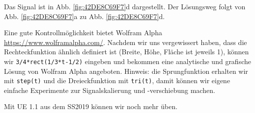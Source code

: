 \documentclass[11pt,a4paper,DIV=12]{scrartcl}
\numberwithin{equation}{section}
\numberwithin{figure}{section}
\newcommand{\fig}[1]{Abb. \ref{#1}} %
\begin{document}
\begin{Loesung}
Das Signal ist in \fig{fig:42DE8C69F7}d dargestellt. Der Lösungsweg folgt von
\fig{fig:42DE8C69F7}a zu \fig{fig:42DE8C69F7}d.

Eine gute Kontrollmöglichkeit bietet Wolfram Alpha
\url{https://www.wolframalpha.com/}.
Nachdem wir uns vergewissert haben, dass die Rechteckfunktion ähnlich definiert
ist (Breite, Höhe, Fläche ist jeweils 1), können wir
\verb|3/4*rect(1/3*t-1/2)| eingeben und bekommen eine analytische und grafische
Lösung von Wolfram Alpha angeboten.
Hinweis: die Sprungfunktion erhalten wir mit \verb|step(t)|
und die Dreieckfunktion mit \verb|tri(t)|, damit können wir eigene einfache
Experimente zur Signalskalierung und -verschiebung machen.

Mit UE 1.1 aus dem SS2019 können wir noch mehr üben.
\end{Loesung}
\end{document}
